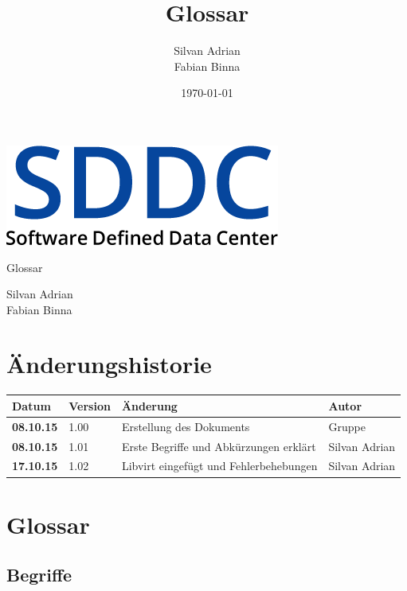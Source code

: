 \documentclass[11pt]{scrartcl}
\title{Glossar}
\author{Silvan Adrian \\ Fabian Binna}
\date{\today{}}
\begin{document}
\def\arraystretch{1.5}
\begin{titlepage}
\begin{center}
\vspace{10em}
\includegraphics[scale=2]{SDDC}
\vspace{10em}
\end{center}
\begin{center}
\huge {Glossar}
\end{center}
\begin{center}
\vspace{10em}
\LARGE {Silvan Adrian} \\
\LARGE {Fabian Binna}
\end{center}

\end{titlepage}

\newpage
\section{Änderungshistorie}
\begin{tabularx}{\linewidth}{l l X l}
\textbf{Datum} & \textbf{Version} & \textbf{Änderung}  & \textbf{Autor} \\
\hline
\textbf{08.10.15} & 1.00 & Erstellung des Dokuments & Gruppe \\
\textbf{08.10.15} & 1.01 & Erste Begriffe und Abkürzungen erklärt & Silvan Adrian\\
\textbf{17.10.15} & 1.02 & Libvirt eingefügt und Fehlerbehebungen & Silvan Adrian\\
\end{tabularx}

\newpage
\tableofcontents
\newpage

\section{Glossar}
\subsection{Begriffe}
\end{document}
